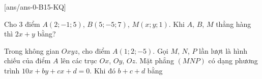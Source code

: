 [ans/ans-0-B15-KQ]
\caukq
\begin{ex}%
	Cho 3 điểm $A(2;-1;5)$, $B(5;-5;7)$, $M(x;y;1)$. Khi $A$, $B$, $M$ thẳng hàng thì $2x+y$ bằng?
	\par {}
\end{ex}
\begin{ex}%
	Trong không gian $Oxyz$, cho điểm $A(1;2;-5)$. Gọi $M$, $N$, $P$ lần lượt là hình chiếu của điểm $A$ lên các trục $Ox$, $Oy$, $Oz$. Mặt phẳng $(MNP)$ có dạng phương trình $10x+by+cx+d=0$. Khi đó $b+c+d$ bằng
	\par{}
\end{ex}
